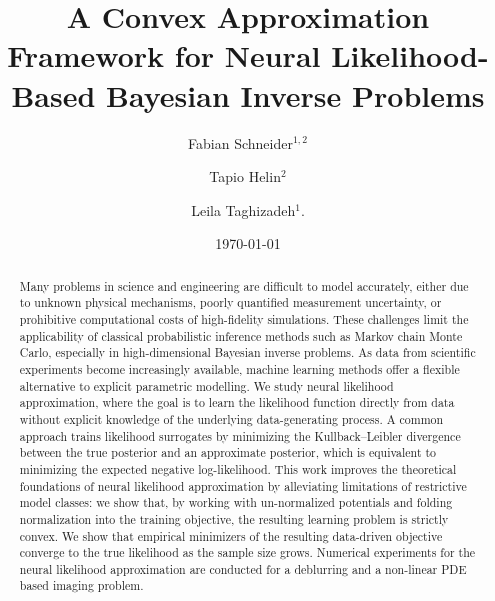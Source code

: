 \documentclass{amsart}
\title[Convex Neural Likelihood Approximation]{A Convex Approximation Framework for Neural Likelihood-Based Bayesian Inverse Problems}
\author[Schneider, Helin, Taghizadeh]{Fabian Schneider$^{1, 2}$ \and Tapio Helin$^2$ \and Leila Taghizadeh$^1$.}
\date{\today}
\theoremstyle{definition}
\begin{document}
\begin{abstract}
Many problems in science and engineering are difficult to model accurately, either due to unknown physical mechanisms, poorly quantified measurement uncertainty, or prohibitive computational costs of high-fidelity simulations. These challenges limit the applicability of classical probabilistic inference methods such as Markov chain Monte Carlo, especially in high-dimensional Bayesian inverse problems. As data from scientific experiments become increasingly available, machine learning methods offer a flexible alternative to explicit parametric modelling.
We study neural likelihood approximation, where the goal is to learn the likelihood function directly from data without explicit knowledge of the underlying data-generating process. A common approach trains likelihood surrogates by minimizing the Kullback–Leibler divergence between the true posterior and an approximate posterior, which is equivalent to minimizing the expected negative log-likelihood. This work improves the theoretical foundations of neural likelihood approximation by alleviating limitations of restrictive model classes: we show that, by working with un-normalized potentials and folding normalization into the training objective, the resulting learning problem is strictly convex. We show that empirical minimizers of the resulting data-driven objective converge to the true likelihood as the sample size grows. Numerical experiments for the neural likelihood approximation are conducted for a deblurring and a non-linear PDE based imaging problem.
\end{abstract}


\maketitle


\end{document}
